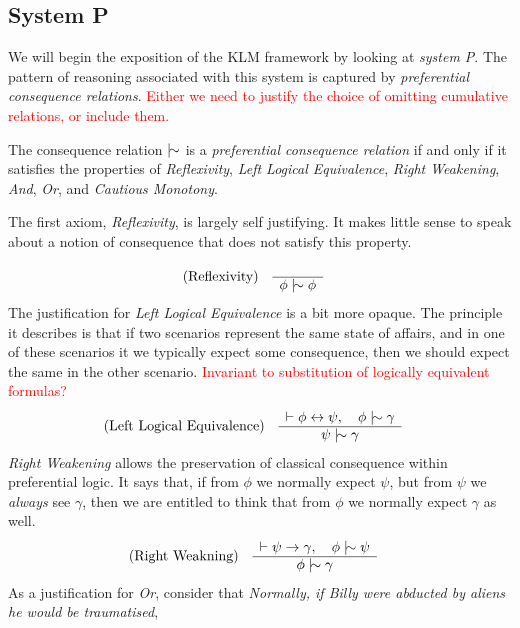 \subsection{System P}
\label{subsection:system-P} 

We will begin the exposition of the KLM framework by looking at \textit{system P}. The pattern of reasoning associated with
this system is captured by \textit{preferential consequence relations}. \textcolor{red}{Either we need to justify the
	choice of omitting cumulative relations, or include them.}

\begin{definition}
	\label{definition:preferential-relation}

	The consequence relation $\twiddle$ is a \emph{preferential consequence relation} if and only if it satisfies the properties
	of \emph{Reflexivity}, \emph{Left Logical Equivalence}, \emph{Right Weakening}, \emph{And}, \emph{Or}, and \emph{Cautious
		Monotony}.
\end{definition}
%
The first axiom, \textit{Reflexivity}, is largely self justifying. It makes little sense to speak about a notion of
consequence that does not satisfy this property.
%
\begin{align}
	\label{postulate:ref}\inferLeft{Reflexivity}{}{\phi \twiddle \phi}
\end{align}
%
The justification for \textit{Left Logical Equivalence} is a bit more opaque. The principle it describes is that if two scenarios
represent the same state of affairs, and in one of these scenarios it we typically expect some consequence, then we should
expect the same in the other scenario. \textcolor{red}{Invariant to substitution of logically equivalent formulas?}
%
\begin{align}
	\label{postulate:lle}\inferLeft{Left Logical Equivalence}{\vdash \phi \leftrightarrow \psi, \quad \phi \twiddle \gamma}{\psi \twiddle \gamma}
\end{align}
%
\textit{Right Weakening} allows the preservation of classical consequence within preferential logic. It says that, if
from $\phi$ we normally expect $\psi$, but from $\psi$ we \textit{always} see $\gamma$, then we are entitled to think that
from $\phi$ we normally expect $\gamma$ as well.
%
\begin{align}
	\label{postulate:rw}\inferLeft{Right Weakning}{\vdash \psi \rightarrow \gamma, \quad \phi \twiddle \psi}{\phi \twiddle \gamma}
\end{align}
%
As a justification for \textit{Or}, consider that \textit{Normally, if Billy were abducted by aliens he would be traumatised},
